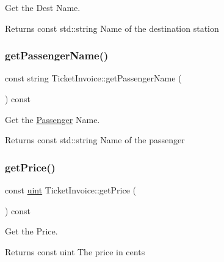 Get the Dest Name. 

\begin{DoxyReturn}{Returns}
const std\+::string Name of the destination station 
\end{DoxyReturn}
\mbox{\label{classTicketInvoice_a9fdfdcd08ff90480ca85e027f57033e4}} 
\subsubsection{\texorpdfstring{get\+Passenger\+Name()}{getPassengerName()}}
{\footnotesize\ttfamily const string Ticket\+Invoice\+::get\+Passenger\+Name (\begin{DoxyParamCaption}{ }\end{DoxyParamCaption}) const}



Get the \mbox{\hyperlink{classPassenger}{Passenger}} Name. 

\begin{DoxyReturn}{Returns}
const std\+::string Name of the passenger 
\end{DoxyReturn}
\mbox{\label{classTicketInvoice_a3758bface685702a6229d617691663e1}} 
\subsubsection{\texorpdfstring{get\+Price()}{getPrice()}}
{\footnotesize\ttfamily const \mbox{\hyperlink{project__utils_8h_a91ad9478d81a7aaf2593e8d9c3d06a14}{uint}} Ticket\+Invoice\+::get\+Price (\begin{DoxyParamCaption}{ }\end{DoxyParamCaption}) const}



Get the Price. 

\begin{DoxyReturn}{Returns}
const uint The price in cents 
\end{DoxyReturn}
\mbox{\label{classTicketInvoice_a97998091765f01ff9f394210530a89ed}} 

